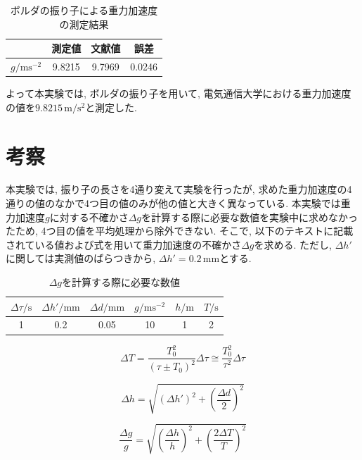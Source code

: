 \documentclass{jarticle}
\begin{document}
\begin{table}[h]
  \centering
  \caption{ボルダの振り子による重力加速度の測定結果}
  \begin{tabular}{cccc}
    \hline
    & 測定値 & 文献値\cite{uec-atom} & 誤差 \\
    \hline
    $g/\mathrm{ms^{-2}}$ & 9.8215 & 9.7969 & 0.0246 \\
    \hline
  \end{tabular}
\end{table}

よって本実験では, ボルダの振り子を用いて, 電気通信大学における重力加速度の値を$9.8215\,\mathrm{m/s^2}$と測定した.


\section{考察}


本実験では, 振り子の長さを4通り変えて実験を行ったが, 求めた重力加速度の4通りの値のなかで4つ目の値のみが他の値と大きく異なっている.
本実験では重力加速度$g$に対する不確かさ$\Delta g$を計算する際に必要な数値を実験中に求めなかったため, 4つ目の値を平均処理から除外できない.
そこで, 以下のテキストに記載されている値および式を用いて重力加速度の不確かさ$\Delta g$を求める. ただし, $\Delta h'$に関しては実測値のばらつきから, $\Delta h'=0.2\,\mathrm{mm}$とする.

\begin{table}[h]
  \centering
  \caption{$\Delta g$を計算する際に必要な数値}
  \begin{tabular}{cccccc}
    \hline
    $\Delta\tau/\mathrm{s}$ & $\Delta h'/\mathrm{mm}$ & $\Delta d/\mathrm{mm}$ & $g/\mathrm{ms^{-2}}$ & $h/\mathrm{m}$ & $T/\mathrm{s}$ \\
    \hline
    1 & 0.2 & 0.05 & 10 & 1 & 2 \\
    \hline
  \end{tabular}
\end{table}


\begin{equation}
  \Delta T=\frac{T_0^2}{(\tau\pm T_0)^2}\Delta\tau\cong\frac{T_0^2}{\tau^2}\Delta\tau
\end{equation}

\begin{equation}
  \Delta h=\sqrt{(\Delta h')^2+\left(\frac{\Delta d}{2}\right)^2}
\end{equation}

\begin{equation}
  \frac{\Delta g}{g}=\sqrt{\left(\frac{\Delta h}{h}\right)^2+\left(\frac{2\Delta T}{T}\right)^2}
\end{equation}
\end{document}
